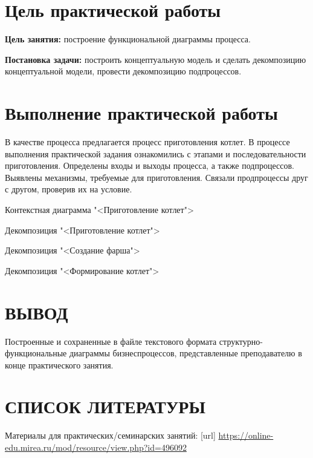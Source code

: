 \graphicspath{{./second/img/}}

\section{Цель практической работы}
\textbf{Цель занятия:}
построение функциональной диаграммы процесса.\par
\textbf{Постановка задачи:} построить концептуальную модель и сделать
декомпозицию концептуальной модели, провести декомпозицию подпроцессов.\par

\section{Выполнение практической работы}
В качестве процесса предлагается процесс приготовления котлет.
В процессе выполнения практической задания ознакомились
с этапами и последовательности приготовления.
Определены входы и выходы процесса, а также подпроцессов. Выявлены механизмы,
требуемые для приготовления. Связали продпроцессы друг с другом, проверив их
на условие.

\begin{image}
	\caption{Контекстная диаграмма "<Приготовление котлет">}
	\label{fig:IDEF0:a0}
\end{image}

\begin{image}
	\caption{Декомпозиция "<Приготовление котлет">}
	\label{fig:IDEF0:a1}
\end{image}

\begin{image}
	\caption{Декомпозиция "<Создание фарша">}
	\label{fig:IDEF0:a1.1}
\end{image}


\begin{image}
	\caption{Декомпозиция "<Формирование котлет">}
	\label{fig:IDEF0:a1.3}
\end{image}

\section*{ВЫВОД}
Построенные и сохраненные в
файле текстового формата структурно-функциональные диаграммы бизнеспроцессов,
представленные преподавателю в конце практического занятия.

\section*{СПИСОК ЛИТЕРАТУРЫ}
\begin{thebibliography}{}
    \bibitem{}  Материалы для практических/семинарских занятий: [url] 
		\url{https://online-edu.mirea.ru/mod/resource/view.php?id=496092}
\end{thebibliography}
